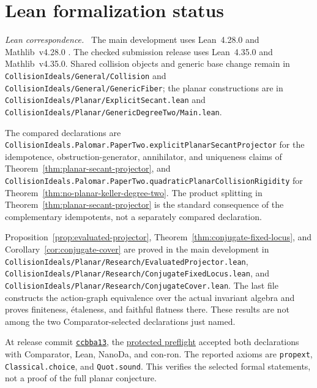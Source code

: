 \documentclass[11pt]{article}
\newcommand{\leanpath}[1]{\texttt{\nolinkurl{#1}}}
\newenvironment{leanfiles}
  {\par\medskip\begingroup\footnotesize\raggedright\noindent
   \textit{Lean correspondence.}\ }
  {\par\endgroup\medskip}
\begin{document}
\section{Lean formalization status}
\label{sec:lean-status}

\begin{leanfiles}
The main development uses Lean~4.28.0 and Mathlib~v4.28.0
\cite{Lean4,Mathlib}.  The checked submission release uses Lean~4.35.0 and
Mathlib~v4.35.0.  Shared collision objects and generic base change remain in
\leanpath{CollisionIdeals/General/Collision} and
\leanpath{CollisionIdeals/General/GenericFiber}; the planar constructions
are in \leanpath{CollisionIdeals/Planar/ExplicitSecant.lean} and
\leanpath{CollisionIdeals/Planar/GenericDegreeTwo/Main.lean}.

The compared declarations are
\leanpath{CollisionIdeals.Palomar.PaperTwo.explicitPlanarSecantProjector}
for the idempotence, obstruction-generator, annihilator, and uniqueness
claims of Theorem~\ref{thm:planar-secant-projector}, and
\leanpath{CollisionIdeals.Palomar.PaperTwo.quadraticPlanarCollisionRigidity}
for Theorem~\ref{thm:no-planar-keller-degree-two}.
The product splitting in Theorem~\ref{thm:planar-secant-projector} is the
standard consequence of the complementary idempotents, not a separately
compared declaration.

Proposition~\ref{prop:evaluated-projector},
Theorem~\ref{thm:conjugate-fixed-locus}, and
Corollary~\ref{cor:conjugate-cover} are proved in the main development in
\leanpath{CollisionIdeals/Planar/Research/EvaluatedProjector.lean},
\leanpath{CollisionIdeals/Planar/Research/ConjugateFixedLocus.lean},
and \leanpath{CollisionIdeals/Planar/Research/ConjugateCover.lean}.
The last file constructs the action-graph equivalence over the actual
invariant algebra and proves finiteness, \'etaleness, and faithful
flatness there.  These results are not among the two Comparator-selected
declarations just named.

At release commit
\href{https://github.com/what-social-construct/jacobian-collision-geometry/tree/ccbba1356d6e737e1e7dd336a7014360e2f52251}
{\texttt{ccbba13}}, the
\href{https://github.com/what-social-construct/jacobian-collision-geometry/actions/runs/41967486280}
{protected preflight}
accepted both declarations with Comparator, Lean, NanoDa, and con-ron.
The reported axioms are \texttt{propext}, \texttt{Classical.choice}, and
\texttt{Quot.sound}.  This verifies the selected formal statements, not a
proof of the full planar conjecture.


\end{leanfiles}
\end{document}
